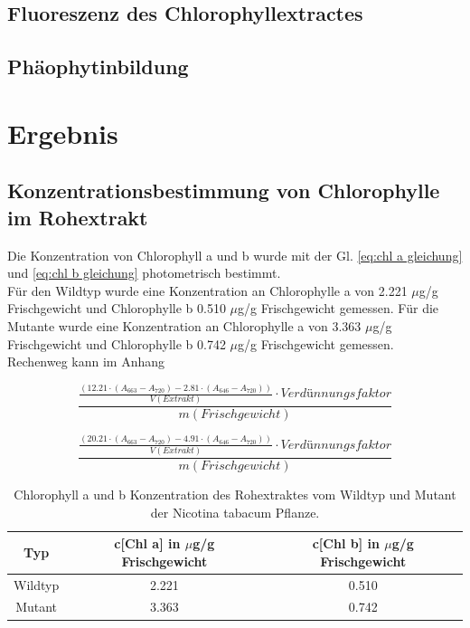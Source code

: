 \documentclass[10pt,a4paper]{article}
\begin{document}
		\subsection{Fluoreszenz des Chlorophyllextractes}
		\subsection{Phäophytinbildung}
	
	\section{Ergebnis}
		\subsection{Konzentrationsbestimmung von Chlorophylle im Rohextrakt}
		Die Konzentration von Chlorophyll a und b wurde mit der Gl. \ref{eq:chl a gleichung} und \ref*{eq:chl b gleichung} photometrisch bestimmt.\\
		Für den Wildtyp wurde eine Konzentration an Chlorophylle a von 2.221 $\mu$g/g Frischgewicht und Chlorophylle b 0.510 $\mu$g/g Frischgewicht gemessen. Für die Mutante wurde eine Konzentration an Chlorophylle a von 3.363 $\mu$g/g Frischgewicht und Chlorophylle b 0.742 $\mu$g/g Frischgewicht gemessen.\\
		Rechenweg kann im Anhang 
		
		\begin{equation}\label{eq:chl a gleichung}
			\frac{\frac{(12.21 \cdot (A_{663} - A_{720}) - 2.81 \cdot (A_{646} - A_{720}))}{V(Extrakt)} \cdot Verdünnungsfaktor}{m(Frischgewicht)}
		\end{equation}
		
		\begin{equation}\label{eq:chl b gleichung}
			\frac{\frac{(20.21 \cdot (A_{663} - A_{720}) - 4.91 \cdot (A_{646} - A_{720}))}{V(Extrakt)} \cdot Verdünnungsfaktor}{m(Frischgewicht)}
		\end{equation}
		
			\begin{table}[H]
				\centering
				\caption{Chlorophyll a und b Konzentration des Rohextraktes vom Wildtyp und Mutant der Nicotina tabacum Pflanze.}
				\label{tab:konzentration chl a und b}
				\begin{tabular}{ccc}
					\toprule
					Typ&c[Chl a] in $\mu$g/g Frischgewicht & c[Chl b] in $\mu$g/g Frischgewicht\\
					\midrule
					Wildtyp& 2.221 & 0.510\\
					Mutant & 3.363 & 0.742\\
					\bottomrule
				\end{tabular}
			\end{table}	
		
\end{document}
